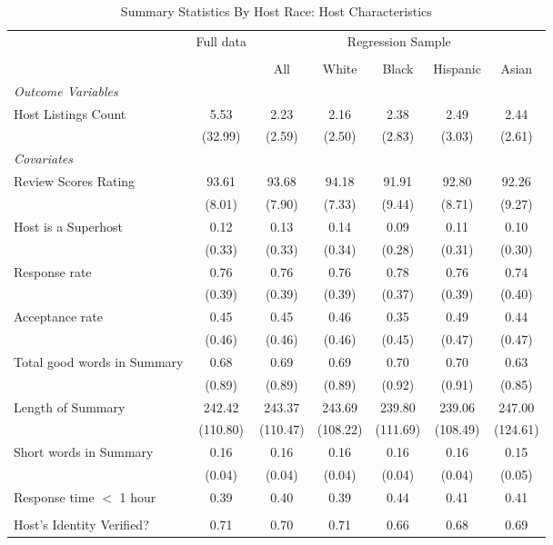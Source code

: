 \begin{table}[htbp]
\caption{Summary Statistics By Host Race: Host Characteristics}
\begin{center}%
\small\begin{tabular}{l c | c | c c c c}
& \multicolumn{1}{c}{Full data} & \multicolumn{5}{c}{Regression Sample}
\\
 \cmidrule(r){3-7}
\\
 & \multicolumn{1}{c}{} & \multicolumn{1}{c}{All} & White & Black & Hispanic & Asian
\\
\hline\hline\noalign{\smallskip} 
 \textit{\textit{Outcome Variables}} & & & & & & \\ Host Listings Count & 5.53 & 2.23 & 2.16 & 2.38 & 2.49 & 2.44 \\
 & (32.99) & (2.59) & (2.50) & (2.83) & (3.03) & (2.61) \\
 \textit{Covariates} & & & & & & \\ \hline Review Scores Rating & 93.61 & 93.68 & 94.18 & 91.91 & 92.80 & 92.26 \\
 & (8.01) & (7.90) & (7.33) & (9.44) & (8.71) & (9.27) \\
 Host is a Superhost & 0.12 & 0.13 & 0.14 & 0.09 & 0.11 & 0.10 \\
 & (0.33) & (0.33) & (0.34) & (0.28) & (0.31) & (0.30) \\
 Response rate & 0.76 & 0.76 & 0.76 & 0.78 & 0.76 & 0.74 \\
 & (0.39) & (0.39) & (0.39) & (0.37) & (0.39) & (0.40) \\
 Acceptance rate & 0.45 & 0.45 & 0.46 & 0.35 & 0.49 & 0.44 \\
 & (0.46) & (0.46) & (0.46) & (0.45) & (0.47) & (0.47) \\
 Total good words in Summary & 0.68 & 0.69 & 0.69 & 0.70 & 0.70 & 0.63 \\
 & (0.89) & (0.89) & (0.89) & (0.92) & (0.91) & (0.85) \\
 Length of Summary & 242.42 & 243.37 & 243.69 & 239.80 & 239.06 & 247.00 \\
 & (110.80) & (110.47) & (108.22) & (111.69) & (108.49) & (124.61) \\
 Short words in Summary & 0.16 & 0.16 & 0.16 & 0.16 & 0.16 & 0.15 \\
 & (0.04) & (0.04) & (0.04) & (0.04) & (0.04) & (0.05) \\
 Response time $<$ 1 hour & 0.39 & 0.40 & 0.39 & 0.44 & 0.41 & 0.41 \\  &  &  &  &  &  &  \\ Host's Identity Verified? & 0.71 & 0.70 & 0.71 & 0.66 & 0.68 & 0.69 \\

\end{tabular}
\end{center}
\end{table}
